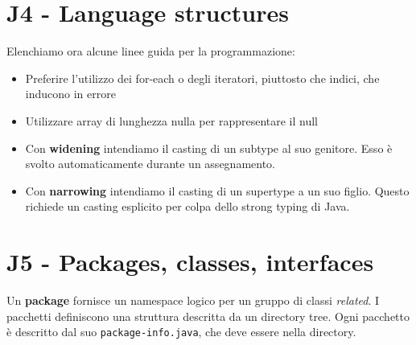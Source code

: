 \documentclass[11pt]{article}
\newcommand{\code}[1]{\texttt{#1}}
\begin{document}
\section{J4 - Language structures}
Elenchiamo ora alcune linee guida per la programmazione:
\begin{itemize}
    \item Preferire l'utilizzo dei for-each o degli iteratori, piuttosto che indici, che inducono in errore
    \item Utilizzare array di lunghezza nulla per rappresentare il null
    \item Con \textbf{widening} intendiamo il casting di un subtype al suo genitore. Esso è svolto automaticamente durante un assegnamento. 
    \item Con \textbf{narrowing} intendiamo il casting di un supertype a un suo figlio. Questo richiede un casting esplicito per colpa dello strong typing di Java.
\end{itemize}
\section{J5 - Packages, classes, interfaces}
Un \textbf{package} fornisce un namespace logico per un gruppo di classi \textit{related}. I pacchetti definiscono una struttura descritta da un directory tree. Ogni pacchetto è descritto dal suo \code{package-info.java}, che deve essere nella directory. 
\end{document}
